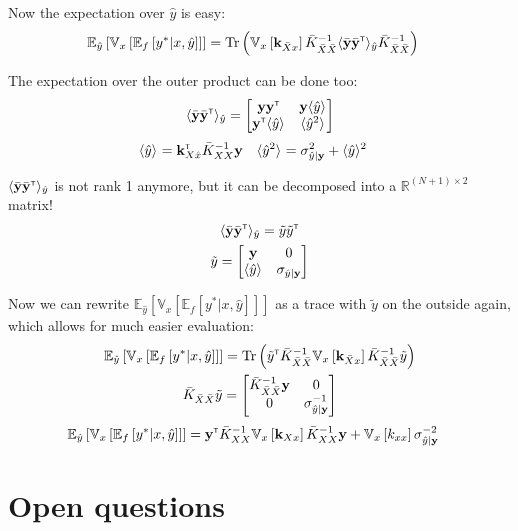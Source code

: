 \documentclass[a4paper,12pt]{article}
\newcommand{\transpose}{^\mathrm{\textsf{\tiny T}}}
\DeclareMathOperator{\Tr}{Tr}
\newcommand{\inv}{^{-1}}
\newcommand{\Reals}{\mathbb{R}}
\newcommand{\ExpSymb}{\mathbb{E}}
\newcommand{\Exp}[2]{\ExpSymb_{#1}\left[#2\right]}
\newcommand{\bExp}[2]{\langle #2 \rangle_{#1}}
\newcommand{\Var}[2]{\mathbb{V}_{#1}\left[#2\right]}
\newcommand{\vk}{\mathbf{k}}
\newcommand{\vy}{\mathbf{y}}
\newcommand{\is}{x}                      %
\newcommand{\os}{y^*}                    %
\newcommand{\fo}{\hat{y}}                %
\newcommand{\fostd}{\sigma_{\fo|\vy}}
\newcommand{\fovar}{\fostd^{2}}
\newcommand{\foprec}{\fostd^{-2}}
\newcommand{\fin}{\hat{x}}               %
\newcommand{\Xaug}{\bar{X}}
\newcommand{\yaug}{\bar{\vy}}
\newcommand{\K}{\bar{K}_{XX}}
\newcommand{\Kaug}{\bar{K}_{\Xaug\Xaug}}
\newcommand{\Kaugis}{\vk_{\Xaug \is}}
\newcommand{\mfo}{\bExp{}{\fo}}
\begin{document}
Now the expectation over $\fo$ is easy:
\begin{align}
\Exp{\fo}{\Var{\is}{\Exp{f}{\os|\is, \fo}}} &= \Tr\left( \Var{\is}{\Kaugis}\Kaug\inv \bExp{\fo}{\yaug\yaug\transpose} \Kaug\inv \right)
\end{align}

The expectation over the outer product can be done too:
\begin{align}
\bExp{\fo}{\yaug\yaug\transpose} = \begin{bmatrix} \vy\vy\transpose & \vy\mfo \\ \vy\transpose\mfo & \bExp{}{\fo^2} \end{bmatrix}
\end{align}
\begin{align}
\mfo &= \vk_{X\fin}\transpose\K\inv\vy & \bExp{}{\fo^2} &= \fovar + \mfo^2
\end{align}

$\bExp{\fo}{\yaug\yaug\transpose}$ is not rank 1 anymore, but it can be decomposed into a $\Reals^{(N+1)\times 2}$ matrix!
\begin{gather}
\bExp{\fo}{\yaug\yaug\transpose} = \tilde{y}\tilde{y}\transpose \\
\tilde{y}=\begin{bmatrix} \vy & 0 \\ \mfo & \fostd \end{bmatrix}
\end{gather}

Now we can rewrite $\Exp{\fo}{\Var{\is}{\Exp{f}{\os|\is, \fo}}}$ as a trace with $\tilde{y}$ on the outside again, which allows for much easier evaluation:
\begin{gather}
\Exp{\fo}{\Var{\is}{\Exp{f}{\os|\is, \fo}}} = \Tr\left(\tilde{y}\transpose \Kaug\inv \Var{\is}{\Kaugis}\Kaug\inv \tilde{y} \right) \\
\Kaug\tilde{y} = \begin{bmatrix} \Kaug\inv\vy & 0 \\ 0 & \fostd\inv\end{bmatrix}
\end{gather}
\begin{align}
\Exp{\fo}{\Var{\is}{\Exp{f}{\os|\is, \fo}}} &= \vy\transpose\K\inv\Var{\is}{\vk_{X\is}}\K\inv\vy + \Var{\is}{k_{\is\is}}\foprec
\end{align}

\section{Open questions}
\end{document}
